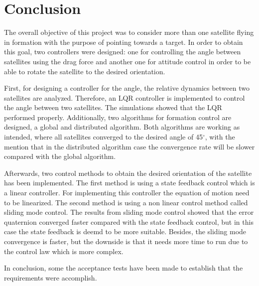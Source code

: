 \chapter{Conclusion}
The overall objective of this project was to consider more than one satellite flying in formation with the purpose of pointing towards a target. In order to obtain this goal, two controllers were designed: one for controlling the angle between satellites using the drag force and another one for attitude control in order to be able to rotate the satellite to the desired orientation.

First, for designing a controller for the angle, the relative dynamics between two satellites are analyzed. Therefore, an LQR controller is implemented to control the angle between two satellites. The simulations showed that the LQR performed properly. Additionally, two algorithms for formation control are designed, a global and distributed algorithm. Both algorithms are working as intended, where all satellites converged to the desired angle of 45$^{\circ}$, with the mention that in the distributed algorithm case the convergence rate will be slower compared with the global algorithm.

Afterwards, two control methods to obtain the desired orientation of the satellite has been implemented. The first method is using a state feedback control which is a linear controller. For implementing this controller the equation of motion need to be linearized. The second method is using a non linear control method called sliding mode control. The results from sliding mode control showed that the error quaternion converged faster compared with the state feedback control, but in this case the state feedback is deemd to be more suitable. Besides, the sliding mode convergence is faster, but the downside is that it needs more time to run due to the control law which is more complex. 

In conclusion, some the acceptance tests have been made to establish that the requirements were accomplish. 